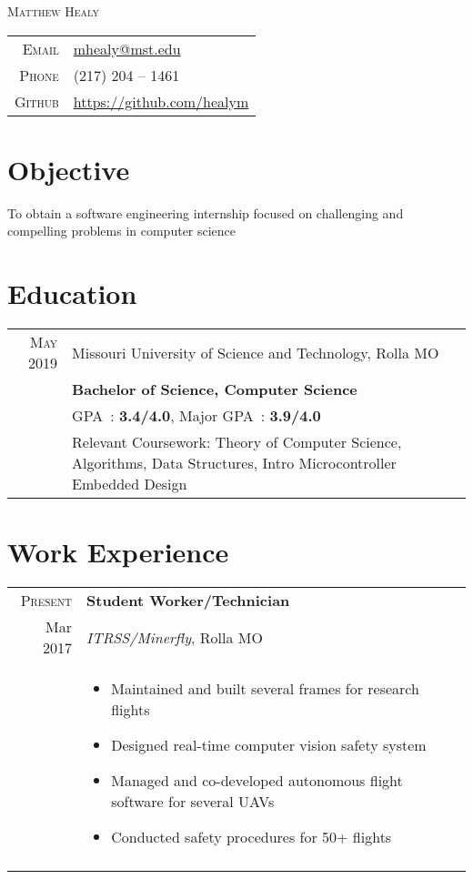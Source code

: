 \documentclass[a4paper,10pt]{article}
\newcommand{\br}{\\\multicolumn{2}{c}{}}
\begin{document}
\pagestyle{empty}

\par{\centering
    {\Huge \textsc{Matthew Healy}
}\bigskip\par}

\begin{center}
\begin{tabular}{rl}
    \textsc{Email } & \href{mailto:mhealy@mst.edu}{mhealy@mst.edu} \\
    \textsc{Phone }        & (217) 204 -- 1461  \\
    \textsc{Github }      & \url{https://github.com/healym}
\end{tabular}
\end{center}

\section{Objective}
To obtain a software engineering internship focused on challenging and compelling problems in computer science


\section{Education}
\begin{tabular}{r|p{15cm}}
    \textsc{May} 2019 & Missouri University of Science and Technology, Rolla MO  \\
                      & \textbf{Bachelor of Science, Computer Science} \\
                      & GPA~: \textbf{3.4/4.0}, Major GPA~: \textbf{3.9/4.0} \\
                      & Relevant Coursework:
                      Theory of Computer Science,
                      Algorithms,
                      Data Structures,
                      Intro Microcontroller Embedded Design
\end{tabular}


\section{Work Experience}
\begin{tabular}{r|p{15cm}}
    \textsc{Present} & \textbf{Student Worker/Technician} \\
    Mar 2017         & \textit{ITRSS/Minerfly}, Rolla MO \\ &
    \begin{itemize}
    \item{Maintained and built several frames for research flights}
    \item{Designed real-time computer vision safety system}
    \item{Managed and co-developed autonomous flight software for several UAVs}
    \item{Conducted safety procedures for 50+ flights}

    \end{itemize} \br\\

\end{tabular}
\end{document}
